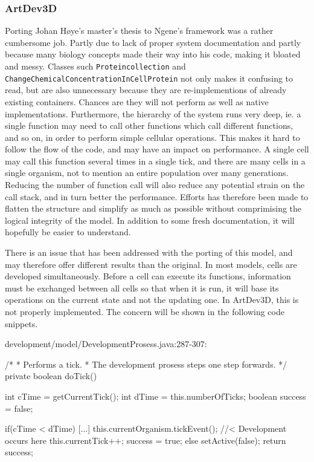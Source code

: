 \subsubsection{ArtDev3D}
Porting Johan H{\o}ye's master's thesis\cite{hoye2006} to Ngene's framework was a rather cumbersome job. Partly due to lack of proper system documentation and partly because many biology concepts made their way into his code, making it bloated and messy. Classes such \texttt{Proteincollection} and \texttt{ChangeChemicalConcentrationInCellProtein} not only makes it confusing to read, but are also unnecessary because they are re-implementions of already existing containers. Chances are they will not perform as well as native implementations. Furthermore, the hierarchy of the system runs very deep, ie. a single function may need to call other functions which call different functions, and so on, in order to perform simple cellular operations. This makes it hard to follow the flow of the code, and may have an impact on performance. A single cell may call this function several times in a single tick, and there are many cells in a single organism, not to mention an entire population over many generations. Reducing the number of function call will also reduce any potential strain on the call stack, and in turn better the performance. Efforts has therefore been made to flatten the structure and simplify as much as possible without comprimising the logical integrity of the model. In addition to some fresh documentation, it will hopefully be easier to understand.

There is an issue that has been addressed with the porting of this model, and may therefore offer different results than the original. In most models, cells are developed simultaneously. Before a cell can execute its functions, information must be exchanged between all cells so that when it is run, it will base its operations on the current state and not the updating one. In ArtDev3D, this is not properly implemented. The concern will be shown in the following code snippets.

\begin{verbatimtab}
development/model/DevelopmentProsess.java:287-307:

/*
 * Performs a tick.
 * The development prosess steps one step forwards.
 */
private boolean doTick() {
	int cTime = getCurrentTick();
	int dTime = this.numberOfTicks;
	boolean success = false;

	if(cTime < dTime) {
		[...]
		this.currentOrganism.tickEvent(); //< Development occurs here
		this.currentTick++;
		success = true;
	} else {
		setActive(false);
	}
	return success;
}
\end{verbatimtab}

